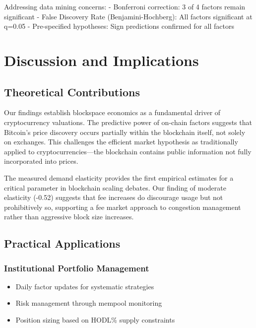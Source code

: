 \documentclass[
  12pt,
  letterpaper,
  DIV=11,
  numbers=noendperiod]{scrartcl}
\providecommand{\tightlist}{%
  \setlength{\itemsep}{0pt}\setlength{\parskip}{0pt}}
\begin{document}
Addressing data mining concerns: - Bonferroni correction: 3 of 4 factors
remain significant - False Discovery Rate (Benjamini-Hochberg): All
factors significant at q=0.05 - Pre-specified hypotheses: Sign
predictions confirmed for all factors

\section{Discussion and Implications}\label{discussion-and-implications}

\subsection{Theoretical Contributions}\label{theoretical-contributions}

Our findings establish blockspace economics as a fundamental driver of
cryptocurrency valuations. The predictive power of on-chain factors
suggests that Bitcoin's price discovery occurs partially within the
blockchain itself, not solely on exchanges. This challenges the
efficient market hypothesis as traditionally applied to
cryptocurrencies---the blockchain contains public information not fully
incorporated into prices.

The measured demand elasticity provides the first empirical estimates
for a critical parameter in blockchain scaling debates. Our finding of
moderate elasticity (-0.52) suggests that fee increases do discourage
usage but not prohibitively so, supporting a fee market approach to
congestion management rather than aggressive block size increases.

\subsection{Practical Applications}\label{practical-applications}

\subsubsection{Institutional Portfolio
Management}\label{institutional-portfolio-management}

\begin{itemize}
\tightlist
\item
  Daily factor updates for systematic strategies
\item
  Risk management through mempool monitoring
\item
  Position sizing based on HODL\% supply constraints
\end{itemize}
\end{document}
